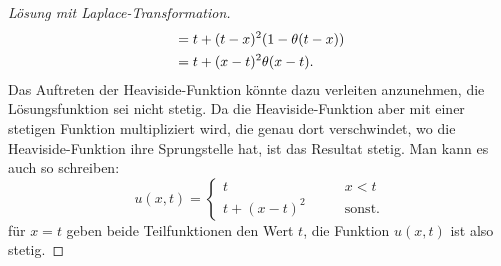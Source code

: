 \begin{proof}[Lösung mit Laplace-Transformation]
\begin{align}
&=
t+(t-x)^2(1- \theta(t-x))
\notag
\\
&=t+(x-t)^2\theta(x-t).
\label{50000009:laplaceloesung}
\end{align}
Das Auftreten der Heaviside-Funktion könnte dazu verleiten anzunehmen,
die Lösungsfunktion sei nicht stetig. Da die Heaviside-Funktion
aber mit einer stetigen Funktion multipliziert wird, die genau dort
verschwindet, wo die Heaviside-Funktion ihre Sprungstelle hat, 
ist das Resultat stetig. Man kann es auch so schreiben:
\[
u(x,t)=\begin{cases}
t&\qquad x<t\\
t+(x-t)^2&\qquad\text{sonst}.
\end{cases}
\]
für $x=t$ geben beide Teilfunktionen den Wert $t$, die Funktion $u(x,t)$
ist also stetig.
\end{proof}

